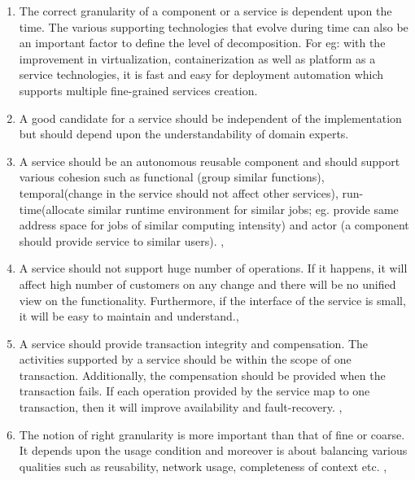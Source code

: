 \begin{enumerate}
\item The correct granularity of a component or a service is dependent upon the time. The various supporting technologies that evolve during time can also be an important factor to define the level of decomposition. For eg: with the improvement in virtualization, containerization as well as platform as a service technologies, it is fast and easy for deployment automation which supports multiple fine-grained services creation.\cite{Peter-Herzum:2000aa}

\item A good candidate for a service should be independent of the implementation but should depend upon the understandability of domain experts.\cite{Raf-Haesen:2015aa, Peter-Herzum:2000aa}

\item A service should be an autonomous reusable component and should support various cohesion such as functional (group similar functions), temporal(change in the service should not affect other services), run-time(allocate similar runtime environment for similar jobs; eg. provide same address space for jobs of similar computing intensity) and actor (a component should provide service to similar users).
\cite{Raf-Haesen:2015aa}, \cite{Peter-Herzum:2000aa}

\item A service should not support huge number of operations. If it happens, it will affect high number of customers on any change and there will be no unified view on the functionality. Furthermore, if the interface of the service is small, it will be easy to maintain and understand.\cite{Raf-Haesen:2015aa}, \cite{Pierre-Reldin:2007aa}

\item A service should provide transaction integrity and compensation. The activities supported by a service should be within the scope of one transaction. Additionally, the compensation should be provided when the transaction fails. If each operation provided by the service map to one transaction, then it will improve availability and fault-recovery. \cite{Raf-Haesen:2015aa}, \cite{Foody:2005aa} \cite{Bianco:2007aa}

\item The notion of right granularity is more important than that of fine or coarse. It depends upon the usage condition and moreover is about balancing various qualities such as reusability, network usage, completeness of context etc. \cite{Raf-Haesen:2015aa}, \cite{Lawrence-Wilkes:2004aa}


\end{enumerate}
